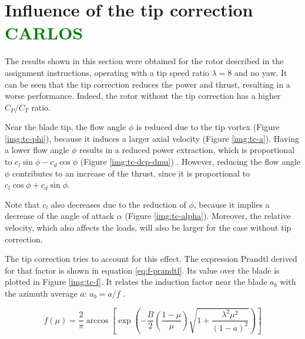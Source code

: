 \section{Influence of the tip correction \textcolor{green}{CARLOS}}

The results shown in this section were obtained for the rotor described in the assignment instructions, operating with a tip speed ratio $ \lambda = 8 $ and no yaw. It can be seen that the tip correction reduces the power and thrust, resulting in a worse performance. Indeed, the rotor without the tip correction has a higher $ C_P/C_T $ ratio.

Near the blade tip, the flow angle $ \phi $ is reduced due to the tip vortex (Figure \ref{img:tc-phi}), because it induces a larger axial velocity (Figure \ref{img:tc-a}). Having a lower flow angle $ \phi $ results in a reduced power extraction, which is proportional to $ c_l \sin \phi - c_d \cos \phi $ (Figure \ref{img:tc-dcp-dmu}) \cite{weh-ch3}. However, reducing the flow angle $ \phi $ contributes to an increase of the thrust, since it is proportional to $ c_l \cos \phi + c_d \sin \phi $.

Note that $ c_l $ also decreases due to the reduction of $ \phi $, because it implies a decrease of the angle of attack $ \alpha $ (Figure \ref{img:tc-alpha}). Moreover, the relative velocity, which also affects the loads, will also be larger for the case without tip correction.

The tip correction tries to account for this effect. The expression Prandtl derived for that factor is shown in equation \ref{eq:f-prandtl}. Its value over the blade is plotted in Figure \ref{img:tc-f}. It relates the induction factor near the blade $ a_b $ with the azimuth average $ a $: $ a_b = a/f $ \cite{weh-ch3}.

\begin{equation}
f(\mu) = \frac{2}{\pi} \arccos \left[ \exp \left( - \frac{B}{2} \left( \frac{1-\mu}{\mu} \right) \sqrt{1+\frac{\lambda^2\mu^2}{(1-a)^2}} \right) \right]
\label{eq:f-prandtl}
\end{equation}

